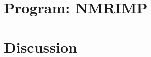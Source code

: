 
\FloatBarrier
\section{Program: NMRIMP}
\label{sec:nmrimp}


\FloatBarrier
\section{Discussion}
\label{sec:discuss05}